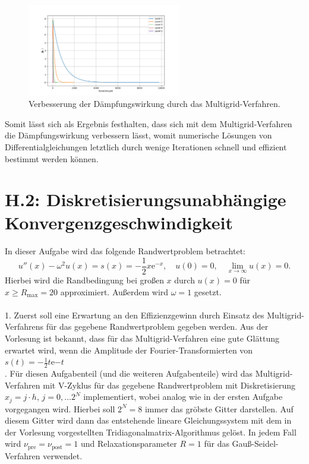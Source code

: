 \documentclass[11pt,a4paper]{article}
\begin{document}
\begin{figure}[htbp]
    \centering
    \includegraphics[width=0.6\textwidth,scale=0.7]{h1_level_comparison}
    \caption[Verbesserung der Dämpfungswirkung durch das Multigrid-Verfahren.]{Verbesserung der Dämpfungswirkung durch das Multigrid-Verfahren.}\label{fig:h1_level_comparison}
\end{figure} Somit lässt sich als Ergebnis festhalten, dass sich mit dem Multigrid-Verfahren die Dämpfungswirkung verbessern lässt, womit numerische Lösungen von Differentialgleichungen letztlich durch wenige Iterationen schnell und effizient bestimmt werden können.\newpage

\section*{H.2: Diskretisierungsunabhängige Konvergenzgeschwindigkeit}\label{sec:h2}

In dieser Aufgabe wird das folgende Randwertproblem betrachtet:
\begin{equation*}
    u''(x) - \omega^2 u(x) = s(x) = -\frac{1}{2} x \mathrm{e}^{-x} , \quad u(0) = 0 , \quad \lim_{x \to \infty} u(x) = 0.
\end{equation*} Hierbei wird die Randbedingung bei großen $x$ durch $u(x) = 0$ für $x \geq R_{\mathrm{max}} = 20$ approximiert. Außerdem wird $\omega = 1$ gesetzt.\\ \\
1. Zuerst soll eine Erwartung an den Effizienzgewinn durch Einsatz des Multigrid-Verfahrens für das gegebene Randwertproblem gegeben werden. Aus der Vorlesung ist bekannt, dass für das Multigrid-Verfahren eine gute Glättung erwartet wird, wenn die Amplitude
der Fourier-Transformierten von $s(t) = -\frac{1}{2}t \mathrm{e}{-t}$ \\

. Für diesen Aufgabenteil (und die weiteren Aufgabenteile) wird das Multigrid-Verfahren mit V-Zyklus für das gegebene Randwertproblem mit Diskretisierung $x_j = j \cdot h$, $j = 0 , \dots 2^N$ implementiert, wobei analog
wie in der ersten Aufgabe vorgegangen wird. Hierbei soll $2^N = 8$ immer das gröbste Gitter darstellen. Auf diesem Gitter wird dann das entstehende lineare Gleichungssystem mit dem in der Vorlesung vorgestellten Tridiagonalmatrix-Algorithmus gelöst.
In jedem Fall wird $\nu_{\mathrm{pre}} = \nu_{\mathrm{post}} = 1$ und Relaxationsparameter $R = 1$ für das Gauß-Seidel-Verfahren verwendet. \\
\end{document}

